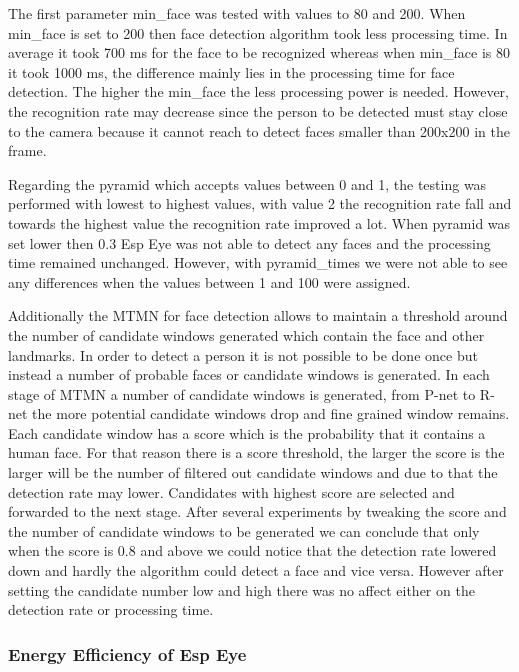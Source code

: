 The first parameter {\selectfont min\_face} was tested with values to 80 and 200. When {\selectfont min\_face} is set to 200 then face detection algorithm took less processing time. In average it took 700 ms for the face to be recognized whereas when {\selectfont min\_face}  is 80 it took 1000 ms, the difference mainly lies in the processing time for face detection. The higher the {\selectfont min\_face} the less processing power is needed. However, the recognition rate may decrease since the person to be detected must stay close to the camera because it cannot reach to detect faces smaller than 200x200 in the frame. 


Regarding the {\selectfont pyramid} which accepts values between 0 and 1, the testing was performed with lowest to highest values, with value 2 the recognition rate fall and towards the highest value the recognition rate improved a lot. When {\selectfont pyramid} was set lower then 0.3 Esp Eye was not able to detect any faces and the processing time remained unchanged. However, with {\selectfont pyramid\_times} we were not able to see any differences when the values between 1 and 100 were assigned.  


Additionally the MTMN for face detection allows to maintain a threshold around the number of candidate windows generated which contain the face and other landmarks. In order to detect a person it is not possible to be done once but instead a number of probable faces or candidate windows is generated. In each stage of MTMN a number of candidate windows is generated, from P-net to R-net the more potential candidate windows drop and fine grained window remains. Each candidate window has a score which is the probability that it contains a human face. For that reason there is a score threshold, the larger the score is the larger will be the number of filtered out candidate windows and due to that the detection rate may lower. Candidates with highest score are selected and forwarded to the next stage. 
After several experiments by tweaking the score and the number of candidate windows to be generated we can conclude that only when the score is  0.8 and above we could notice that the detection rate lowered down and hardly the algorithm could detect a face and vice versa. However after setting the candidate number low and high there was no affect either on the detection rate or processing time. 

\subsubsection{Energy Efficiency of Esp Eye}

